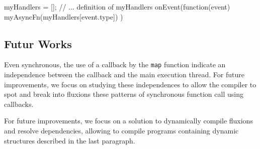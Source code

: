 \begin{code}[Javascript, caption={Example of an unresolvable callback},label={lst:unresolved}]
myHandlers = [];
// ... definition of myHandlers
onEvent(function(event) {
  myAsyncFn(myHandlers[event.type])
})
\end{code}


\subsection{Futur Works}

Even synchronous, the use of a callback by the \texttt{map} function indicate an independence between the callback and the main execution thread.
For future improvements, we focus on studying these independences to allow the compiler to spot and break into fluxions these patterns of synchronous function call using callbacks.

For future improvements, we focus on a solution to dynamically compile fluxions and resolve dependencies, allowing to compile programs containing dynamic structures described in the last paragraph.





